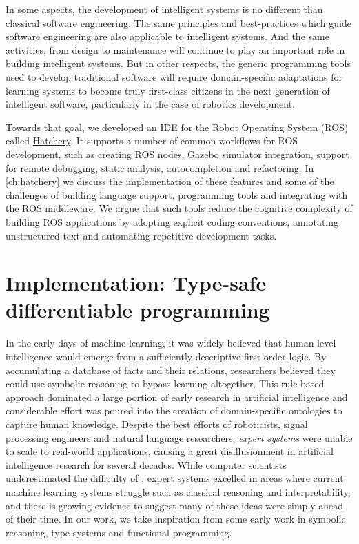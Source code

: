 \documentclass[12pt,initial,twoside,maitrise]{dms}
\numberwithin{equation}{section}
\numberwithin{table}{chapter}
\numberwithin{figure}{chapter}
\begin{document}
In some aspects, the development of intelligent systems is no different than classical software engineering. The same principles and best-practices which guide software engineering are also applicable to intelligent systems. And the same activities, from design to maintenance will continue to play an important role in building intelligent systems. But in other respects, the generic programming tools used to develop traditional software will require domain-specific adaptations for learning systems to become truly first-class citizens in the next generation of intelligent software, particularly in the case of robotics development.

Towards that goal, we developed an IDE for the Robot Operating System (ROS) called \href{https://github.com/duckietown/hatchery}{Hatchery}. It supports a number of common workflows for ROS development, such as creating ROS nodes, Gazebo simulator integration, support for remote debugging, static analysis, autocompletion and refactoring. In \autoref{ch:hatchery} we discuss the implementation of these features and some of the challenges of building language support, programming tools and integrating with the ROS middleware. We argue that such tools reduce the cognitive complexity of building ROS applications by adopting explicit coding conventions, annotating unstructured text and automating repetitive development tasks.

\section{Implementation: Type-safe differentiable programming}

In the early days of machine learning, it was widely believed that human-level intelligence would emerge from a sufficiently descriptive first-order logic. By accumulating a database of facts and their relations, researchers believed they could use symbolic reasoning to bypass learning altogether. This rule-based approach dominated a large portion of early research in artificial intelligence and considerable effort was poured into the creation of domain-specific ontologies to capture human knowledge. Despite the best efforts of roboticists, signal processing engineers and natural language researchers, \textit{expert systems} were unable to scale to real-world applications, causing a great disillusionment in artificial intelligence research for several decades. While computer scientists underestimated the difficulty of , expert systems excelled in areas where current machine learning systems struggle such as classical reasoning and interpretability, and there is growing evidence to suggest many of these ideas were simply ahead of their time. In our work, we take inspiration from some early work in symbolic reasoning, type systems and functional programming.
\end{document}
